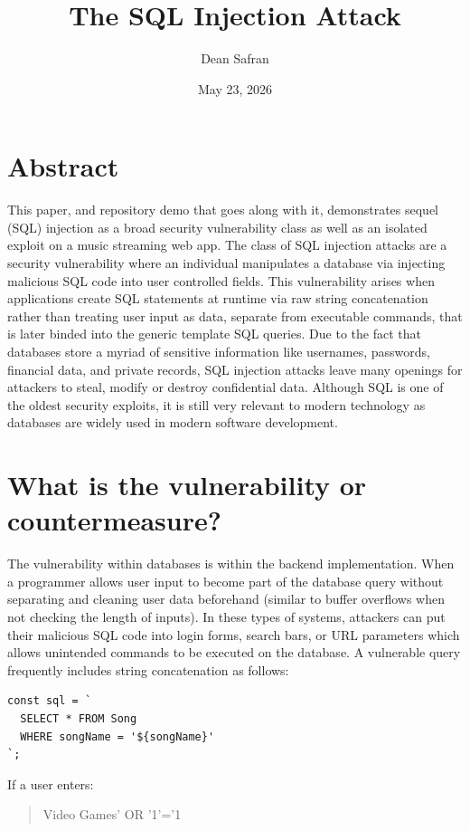 \documentclass[12pt]{article}
\title{The SQL Injection Attack}
\author{Dean Safran}
\date{May 23, 2026}
\begin{document}
\maketitle

\section{Abstract}

This paper, and repository demo that goes along with it, demonstrates sequel (SQL) injection as a broad security vulnerability class as well as an isolated exploit on a music streaming web app. The class of SQL injection attacks are a security vulnerability where an individual manipulates a database via injecting malicious SQL code into user controlled fields. This vulnerability arises when applications create SQL statements at runtime via raw string concatenation rather than treating user input as data, separate from executable commands, that is later binded into the generic template SQL queries. Due to the fact that databases store a myriad of sensitive information like usernames, passwords, financial data, and private records, SQL injection attacks leave many openings for attackers to steal, modify or destroy confidential data. Although SQL is one of the oldest security exploits, it is still very relevant to modern technology as databases are widely used in modern software development.

\section{What is the vulnerability or countermeasure?}

The vulnerability within databases is within the backend implementation. When a programmer allows user input to become part of the database query without separating and cleaning user data beforehand (similar to buffer overflows when not checking the length of inputs). In these types of systems, attackers can put their malicious SQL code into login forms, search bars, or URL parameters which allows unintended commands to be executed on the database. A vulnerable query frequently includes string concatenation as follows:

\begin{lstlisting}
const sql = `
  SELECT * FROM Song
  WHERE songName = '${songName}'
`;
\end{lstlisting}

If a user enters:

\begin{quote}
Video Games' OR '1'='1
\end{quote}
\end{document}
